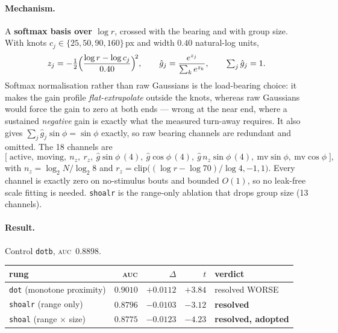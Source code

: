 \documentclass[11pt,a4paper]{article}
\newcommand{\win}[1]{\textcolor{winc}{\textbf{#1}}}
\newcommand{\lose}[1]{\textcolor{losec}{#1}}
\newcommand{\auc}{\textsc{auc}}
\newcommand{\code}[1]{\texttt{\small #1}}
\begin{document}
\paragraph{Mechanism.}
A \textbf{softmax basis over $\log r$}, crossed with the bearing and with group size.
With knots $c_j \in \{25, 50, 90, 160\}$\,px and width $0.40$ natural-log units,
\begin{equation}
z_j = -\tfrac{1}{2}\Bigl(\frac{\log r - \log c_j}{0.40}\Bigr)^{\!2},
\qquad
\hat g_j = \frac{e^{z_j}}{\sum_k e^{z_k}},
\qquad \textstyle\sum_j \hat g_j = 1 .
\end{equation}
Softmax normalisation rather than raw Gaussians is the load-bearing choice: it makes the
gain profile \emph{flat-extrapolate} outside the knots, whereas raw Gaussians would force
the gain to zero at both ends --- wrong at the near end, where a sustained \emph{negative}
gain is exactly what the measured turn-away requires. It also gives
$\sum_j \hat g_j \sin\phi = \sin\phi$ exactly, so raw bearing channels are redundant and
omitted. The 18 channels are
\begin{equation*}
\bigl[\;\text{active},\ \text{moving},\ n_z,\ r_z,\
 \hat g\sin\phi\,(4),\ \hat g\cos\phi\,(4),\
 \hat g\, n_z \sin\phi\,(4),\ \text{mv}\sin\phi,\ \text{mv}\cos\phi\;\bigr],
\end{equation*}
with $n_z = \log_2 N/\log_2 8$ and
$r_z = \mathrm{clip}\bigl((\log r - \log 70)/\log 4, -1, 1\bigr)$. Every channel is
exactly zero on no-stimulus bouts and bounded $O(1)$, so no leak-free scale fitting is
needed. \code{shoalr} is the range-only ablation that drops group size (13 channels).

\paragraph{Result.} Control \code{dotb}, \auc\ $0.8898$.
\begin{center}\small
\begin{tabular}{lrrrl}
\toprule
rung & \auc{} & $\Delta$ & $t$ & verdict \\
\midrule
\code{dot} (monotone proximity) & $0.9010$ & $+0.0112$ & $+3.84$ & \lose{resolved WORSE} \\
\code{shoalr} (range only)      & $0.8796$ & $-0.0103$ & $-3.12$ & \win{resolved} \\
\code{shoal} (range $\times$ size) & $\mathbf{0.8775}$ & $\mathbf{-0.0123}$ & $-4.23$ & \win{resolved, adopted} \\
\bottomrule
\end{tabular}
\end{center}
\end{document}
